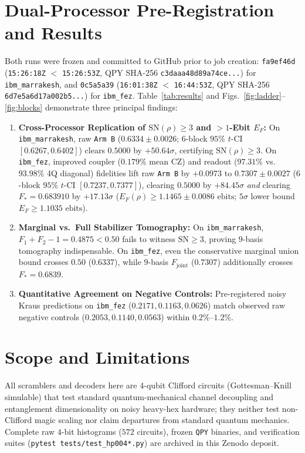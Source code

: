 \documentclass[11pt,twocolumn]{article}
\begin{document}
\section{Dual-Processor Pre-Registration and Results}
Both runs were frozen and committed to GitHub prior to job creation: \texttt{fa9ef46d} (\texttt{15:26:18Z} $<$ \texttt{15:26:53Z}, QPY SHA-256 \texttt{c3daaa48d89a74ce...}) for \texttt{ibm\_marrakesh}, and \texttt{0c5a5a39} (\texttt{16:01:38Z} $<$ \texttt{16:44:53Z}, QPY SHA-256 \texttt{6d7e5a6d17a002b5...}) for \texttt{ibm\_fez}. Table~\ref{tab:results} and Figs.~\ref{fig:ladder}--\ref{fig:blocks} demonstrate three principal findings:
\begin{enumerate}
\item \textbf{Cross-Processor Replication of $\mathrm{SN}(\rho)\ge 3$ and $>1$-Ebit $E_F$:} On \texttt{ibm\_marrakesh}, raw \texttt{Arm B} ($0.6334 \pm 0.0026$; $6$-block $95\%$ $t$-CI $[0.6267, 0.6402]$) clears $0.5000$ by $+50.64\sigma$, certifying $\mathrm{SN}(\rho)\ge 3$. On \texttt{ibm\_fez}, improved coupler ($0.179\%$ mean CZ) and readout ($97.31\%$ vs.\ $93.98\%$ 4Q diagonal) fidelities lift raw \texttt{Arm B} by $+0.0973$ to $0.7307 \pm 0.0027$ ($6$-block $95\%$ $t$-CI $[0.7237, 0.7377]$), clearing $0.5000$ by $+84.45\sigma$ \emph{and} clearing $F_*=0.683910$ by $+17.13\sigma$ ($E_F(\rho)\ge 1.1465 \pm 0.0086\text{ ebits}$; $5\sigma$ lower bound $E_F \ge 1.1035\text{ ebits}$).
\item \textbf{Marginal vs.\ Full Stabilizer Tomography:} On \texttt{ibm\_marrakesh}, $F_1+F_2-1 = 0.4875 < 0.50$ fails to witness $\mathrm{SN}\ge 3$, proving $9$-basis tomography indispensable. On \texttt{ibm\_fez}, even the conservative marginal union bound crosses $0.50$ ($0.6337$), while $9$-basis $F_{\mathrm{joint}}$ ($0.7307$) additionally crosses $F_*=0.6839$.
\item \textbf{Quantitative Agreement on Negative Controls:} Pre-registered noisy Kraus predictions on \texttt{ibm\_fez} ($0.2171, 0.1163, 0.0626$) match observed raw negative controls ($0.2053, 0.1140, 0.0563$) within $0.2\%\text{--}1.2\%$.
\end{enumerate}

\section{Scope and Limitations}
All scramblers and decoders here are $4$-qubit Clifford circuits (Gottesman--Knill simulable) that test standard quantum-mechanical channel decoupling and entanglement dimensionality on noisy heavy-hex hardware; they neither test non-Clifford magic scaling nor claim departures from standard quantum mechanics. Complete raw $4$-bit histograms ($572$ circuits), frozen \texttt{QPY} binaries, and verification suites (\texttt{pytest tests/test\_hp004*.py}) are archived in this Zenodo deposit.
\end{document}
